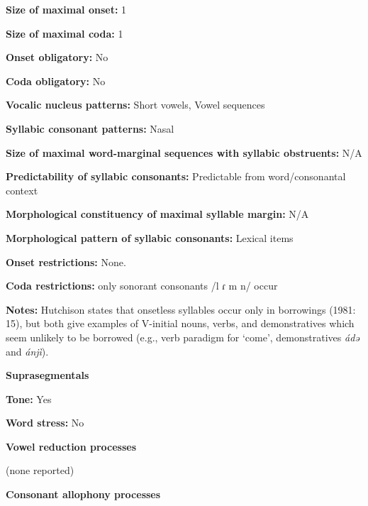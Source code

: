 \textbf{Size of maximal onset:} 1



\textbf{Size of maximal coda:} 1



\textbf{Onset obligatory:} No



\textbf{Coda obligatory:} No



\textbf{Vocalic nucleus patterns:} Short vowels, Vowel sequences



\textbf{Syllabic consonant patterns:} Nasal



\textbf{Size of maximal word{}-marginal sequences with syllabic obstruents:} N/A



\textbf{Predictability of syllabic consonants:} Predictable from word/consonantal context



\textbf{Morphological constituency of maximal syllable margin:} N/A



\textbf{Morphological pattern of syllabic consonants:} Lexical items



\textbf{Onset restrictions:} None.



\textbf{Coda restrictions:} only sonorant consonants /l ɾ m n/ occur \citep[15]{Hutchison1981}



\textbf{Notes:} Hutchison states that onsetless syllables occur only in borrowings (1981: 15), but both \citet{HutchisonCyffer1998} give examples of V-initial nouns, verbs, and demonstratives which seem unlikely to be borrowed (e.g., verb paradigm for ‘come’, demonstratives \textit{ádə} and \textit{ánjì}).



\textbf{Suprasegmentals}



\textbf{Tone:} Yes



\textbf{Word stress:} No



\textbf{Vowel reduction processes}



(none reported)



\textbf{Consonant allophony processes}



